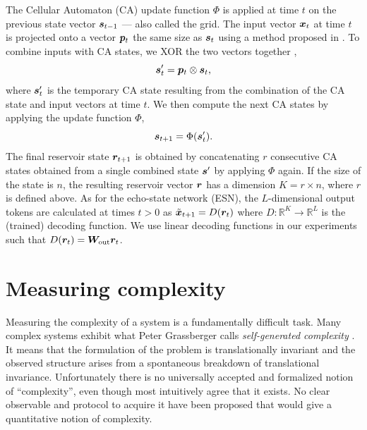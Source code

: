 The Cellular Automaton (CA) update function $\Phi$ is applied at time $t$ on the previous state vector
${\bm{s}}_{t - 1}$ --- also called the grid. The input vector ${\bm{x}}_{t}$ at time $t$ is
projected onto a vector ${\bm{p}}_{t}$ the same size as ${\bm{s}}_{t}$ using a method proposed in
\parencite{yilmazReservoirComputingUsing2014}. To combine inputs with CA states,
we XOR the two vectors together
\parencite{gloverDynamicalLandscapeReservoir2021},
\begin{equation}
  \label{eq:ca-xor}
  {\bm{s}}'_{t} = {\bm{p}}_{t}\otimes {\bm{s}}_{t},
\end{equation}
where ${\bm{s}}'_{t}$ is the temporary CA state resulting from the combination of the
CA state and input vectors at time $t$. We then compute the next CA states by
applying the update function $\Phi$,
\begin{equation}
  \label{eq:ca-state}
  {\bm{s}}_{t + 1} = \Phi({\bm{s}}'_{t}).
\end{equation}
The final reservoir state ${\bm{r}}_{t + 1}$ is obtained by concatenating $r$ consecutive CA
states obtained from a single combined state ${\bm{s}}'$ by applying $\Phi$ again. If
the size of the state is $n$, the resulting reservoir vector ${\bm{r}}$ has a dimension
$K = r \times n$, where $r$ is defined above. As for the echo-state network (ESN), the $L$-dimensional output tokens are
calculated at times $t > 0$ as $\tilde{{\bm{x}}}_{t+ 1} = D({\bm{r}}_{t})$ where
$D: \mathbb{R}^{K} \rightarrow \mathbb{R}^{L}$ is the (trained) decoding function. We use linear decoding functions in
our experiments such that $D({\bm{r}}_{t}) = {\bm{W}}_{\text{out}}{\bm{r}}_{t}$.



\section{Measuring complexity}

Measuring the complexity of a system is a fundamentally difficult task. Many
complex systems exhibit what Peter Grassberger calls \emph{self-generated
  complexity} \parencite{grassbergerQuantitativeTheorySelfgenerated1986}. It
means that the formulation of the problem is translationally invariant and the
observed structure arises from a spontaneous breakdown of translational
invariance. Unfortunately there is no universally accepted and formalized notion
of ``complexity'', even though most intuitively agree that it exists. No clear
observable and protocol to acquire it have been proposed that would give a
quantitative notion of complexity.

